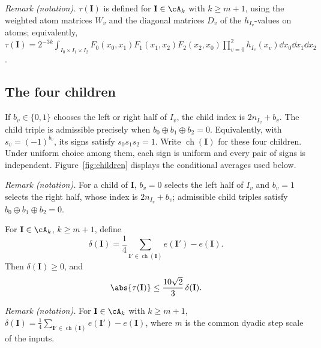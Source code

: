 \noindent\textit{Remark (notation).} $\tau(\mathbf I)$ is defined for $\mathbf I\in\cA_k$ with $k\ge m+1$, using the weighted atom matrices $W_v$ and the diagonal matrices $D_v$ of the $h_{I_v}$-values on atoms; equivalently, $\tau(\mathbf I)=2^{-3k}\int_{I_0\times I_1\times I_2}F_0(x_0,x_1)F_1(x_1,x_2)F_2(x_2,x_0)\prod_{v=0}^2h_{I_v}(x_v)\dd x_0\dd x_1\dd x_2$.


\subsection{The four children}

If \(b_v\in\{0,1\}\) chooses the left or right half of \(I_v\), the
child index is \(2n_{I_v}+b_v\). The child triple is admissible
precisely when \(b_0\oplus b_1\oplus b_2=0\). Equivalently, with
\(s_v=(-1)^{b_v}\), its signs satisfy \(s_0s_1s_2=1\).
Write \(\operatorname{ch}(\mathbf I)\) for these four children.
Under uniform choice among them, each sign is uniform and every pair
of signs is independent. Figure~\ref{fig:children} displays the
conditional averages used below.

\noindent\textit{Remark (notation).} For a child of $\mathbf I$, $b_v=0$ selects the left half of $I_v$ and $b_v=1$ selects the right half, whose index is $2n_{I_v}+b_v$; admissible child triples satisfy $b_0\oplus b_1\oplus b_2=0$.




\begin{proposition}\label{prop:increase}
For \(\mathbf I\in\cA_k\), \(k\ge m+1\), define
\[
 \delta(\mathbf I)
 =\frac14\sum_{\mathbf I'\in\operatorname{ch}(\mathbf I)}
                     e(\mathbf I')-e(\mathbf I).
\]
Then \(\delta(\mathbf I)\ge0\), and
\begin{equation}\label{eq:local-control}
 \abs{\tau(\mathbf I)}
       \le\frac{10\sqrt2}{3}\,\delta(\mathbf I).
\end{equation}
\end{proposition}

\noindent\textit{Remark (notation).} For $\mathbf I\in\cA_k$ with $k\ge m+1$, $\delta(\mathbf I)=\frac14\sum_{\mathbf I'\in\operatorname{ch}(\mathbf I)}e(\mathbf I')-e(\mathbf I)$, where $m$ is the common dyadic step scale of the inputs.


